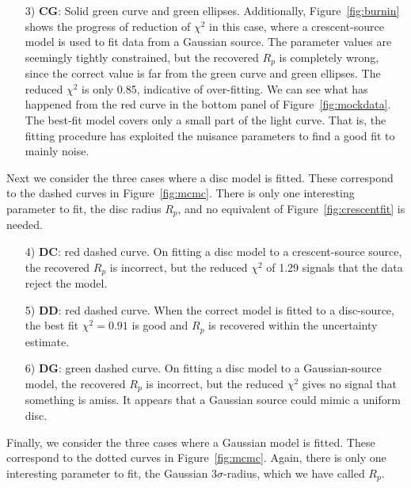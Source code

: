 \begin{enumerate}
\item[3) {\bf CG}:] Solid green curve and green ellipses.
  Additionally, Figure~\ref{fig:burnin} shows the progress of
  reduction of $\chi^2$ in this case, where a crescent-source model is
  used to fit data from a Gaussian source.  The parameter values are
  seemingly tightly constrained, but the recovered $R_p$ is completely
  wrong, since the correct value is far from the green curve and green
  ellipses.  The reduced $\chi^2$ is only 0.85, indicative of
  over-fitting.  We can see what has happened from the red curve in
  the bottom panel of Figure~\ref{fig:mockdata}.  The best-fit model
  covers only a small part of the light curve.  That is, the fitting
  procedure has exploited the nuisance parameters to find a good fit
  to mainly noise.

\end{enumerate}

Next we consider the three cases where a disc model is fitted.  These
correspond to the dashed curves in Figure~\ref{fig:mcmc}.  There is
only one interesting parameter to fit, the disc radius $R_p$, and no
equivalent of Figure~\ref{fig:crescentfit} is needed. 

\begin{enumerate}

\item[4) {\bf DC}:] red dashed curve.  On fitting a disc model to a
  crescent-source source, the recovered $R_p$ is incorrect, but the
  reduced $\chi^2$ of 1.29 signals that the data reject the model.

\item[5) {\bf DD}:] red dashed curve.  When the correct model is
  fitted to a disc-source, the best fit $\chi^2=0.91$ is good and
  $R_p$ is recovered within the uncertainty estimate.

\item[6) {\bf DG}:] green dashed curve.  On fitting a disc model to a
  Gaussian-source model, the recovered $R_p$ is incorrect, but the
  reduced $\chi^2$ gives no signal that something is amiss.  It
  appears that a Gaussian source could mimic a uniform disc.

\end{enumerate}

Finally, we consider the three cases where a Gaussian model is fitted.
These correspond to the dotted curves in Figure~\ref{fig:mcmc}.  Again,
there is only one interesting parameter to fit, the Gaussian
$3\sigma$-radius, which we have called $R_p$.


